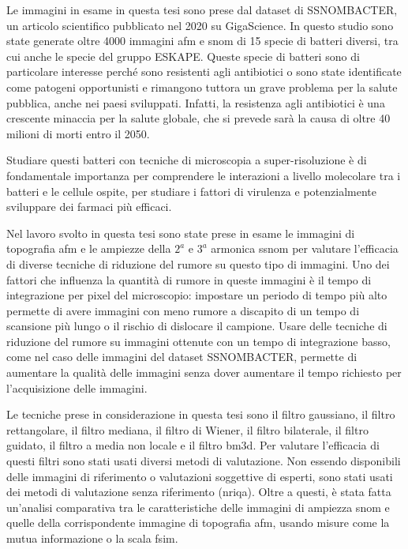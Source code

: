 \documentclass[../main.tex]{subfiles}
\begin{document}
Le immagini in esame in questa tesi sono prese dal dataset di SSNOMBACTER, un articolo scientifico pubblicato  nel 2020 su GigaScience.\cite{ssnombacter} In questo studio sono state generate oltre 4000 immagini \acrshort{afm} e \acrshort{snom} di 15 specie di batteri diversi, tra cui anche le specie del gruppo ESKAPE\cite{eskape}. Queste specie di batteri sono di particolare interesse perché sono resistenti agli antibiotici o sono state identificate come patogeni opportunisti e rimangono tuttora un grave problema per la salute pubblica, anche nei paesi sviluppati.\cite{rice_2008} Infatti, la resistenza agli antibiotici è una crescente minaccia per la salute globale, che si prevede sarà la causa di oltre 40 milioni di morti entro il 2050.\cite{pipito_2025}

Studiare questi batteri con tecniche di microscopia a super-risoluzione è di fondamentale importanza per comprendere le interazioni a livello molecolare tra i batteri e le cellule ospite, per studiare i fattori di virulenza e potenzialmente sviluppare dei farmaci più efficaci.

Nel lavoro svolto in questa tesi sono state prese in esame le immagini di topografia \acrshort{afm} e le ampiezze della $2^a$ e $3^a$ armonica \acrshort{ssnom} per valutare l'efficacia di diverse tecniche di riduzione del rumore su questo tipo di immagini. Uno dei fattori che influenza la quantità di rumore in queste immagini è il tempo di integrazione per pixel del microscopio: impostare un periodo di tempo più alto permette di avere immagini con meno rumore a discapito di un tempo di scansione più lungo o il rischio di dislocare il campione. Usare delle tecniche di riduzione del rumore su immagini ottenute con un tempo di integrazione basso, come nel caso delle immagini del dataset SSNOMBACTER, permette di aumentare la qualità delle immagini senza dover aumentare il tempo richiesto per l'acquisizione delle immagini.\cite{baiz_2025} 

Le tecniche prese in considerazione in questa tesi sono il filtro gaussiano, il filtro rettangolare, il filtro mediana, il filtro di Wiener, il filtro bilaterale, il filtro guidato, il filtro a media non locale e il filtro \acrshort{bm3d}. Per valutare l'efficacia di questi filtri sono stati usati diversi metodi di valutazione. Non essendo disponibili delle immagini di riferimento o valutazioni soggettive di esperti, sono stati usati dei metodi di valutazione senza riferimento (\acrshort{nriqa}). Oltre a questi, è stata fatta un'analisi comparativa tra le caratteristiche delle immagini di ampiezza \acrshort{snom} e quelle della corrispondente immagine di topografia \acrshort{afm}, usando misure come la mutua informazione o la scala \acrshort{fsim}.
\end{document}
